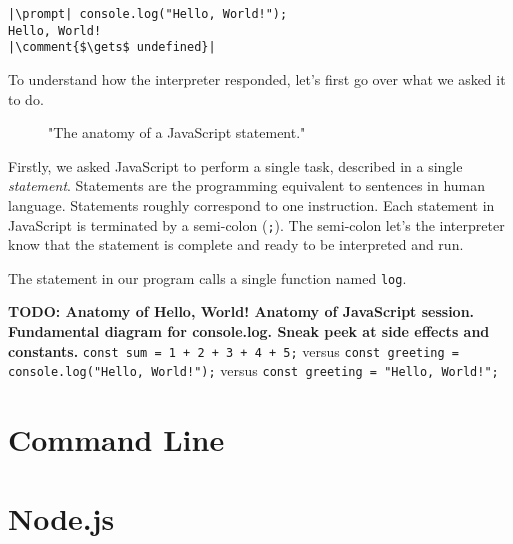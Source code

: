 \reactivatelinenumbers
\begin{lstlisting}[caption={\label{listing:intro-console} A session in the JavaScript console of a web browser.}, escapeinside=||]
|\prompt| console.log("Hello, World!");
Hello, World!
|\comment{$\gets$ undefined}|
\end{lstlisting}

To understand how the interpreter responded, let's first go over what we asked it to do.

\begin{figure}[h]
  
  \caption{"The anatomy of a JavaScript statement."}
\end{figure}

Firstly, we asked JavaScript to perform a single task, described in a single \emph{statement}. Statements are the programming equivalent to sentences in human language. Statements roughly correspond to one instruction. Each statement in JavaScript is terminated by a semi-colon (\texttt{;}). The semi-colon let's the interpreter know that the statement is complete and ready to be interpreted and run.

The statement in our program calls a single function named \texttt{log}.

\textbf{TODO: Anatomy of Hello, World! Anatomy of JavaScript session. Fundamental diagram for console.log. Sneak peek at side effects and constants.} \texttt{const sum = 1 + 2 + 3 + 4 + 5;} versus \texttt{const greeting = console.log("Hello, World!");} versus \texttt{const greeting = "Hello, World!";}


\section{Command Line}

\section{Node.js}
